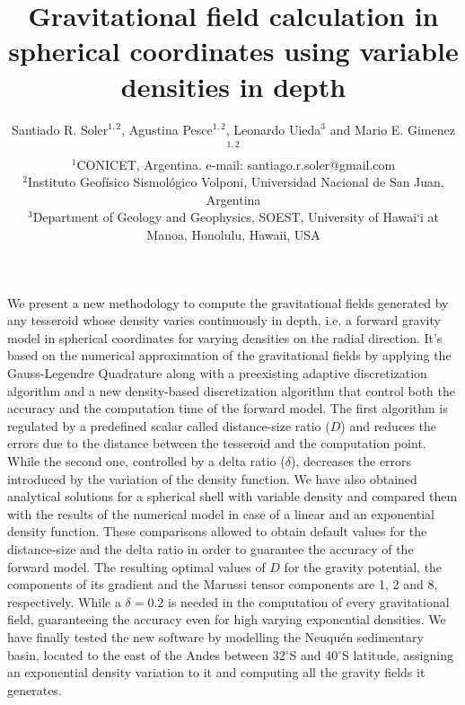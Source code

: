\documentclass[extra]{gji}
\begin{document}
\title[Variable Density Tesseroids]{
    Gravitational field calculation in spherical coordinates using variable 
    densities in depth
}
\author[S.R. Soler, A. Pesce, L. Uieda and M.E. Gimenez]{
    Santiado R. Soler$^{1,2}$, Agustina Pesce$^{1,2}$, Leonardo Uieda$^3$ and
    Mario E. Gimenez$^{1,2}$ \\
    $^1$CONICET, Argentina. e-mail: santiago.r.soler@gmail.com\\
    $^2$Instituto Geofísico Sismológico Volponi, Universidad Nacional de
    San Juan, Argentina\\
    $^3$Department of Geology and Geophysics, SOEST, University of Hawai‘i at
    Manoa, Honolulu, Hawaii, USA
    }


\maketitle

\begin{summary}
We present a new methodology to compute the gravitational fields generated by 
any tesseroid whose density varies continuously in depth, i.e. a forward 
gravity model in spherical coordinates for varying densities on the radial 
direction.
It's based on the numerical approximation of the gravitational fields by 
applying the Gauss-Legendre Quadrature along with a preexisting adaptive 
discretization algorithm and a new density-based discretization algorithm that 
control both the accuracy and the computation time of the forward model.
The first algorithm is regulated by a predefined scalar called distance-size 
ratio ($D$) and reduces the errors due to the distance between the tesseroid 
and the computation point.
While the second one, controlled by a delta ratio ($\delta$), decreases the 
errors introduced by the variation of the density function.
We have also obtained analytical solutions for a spherical shell with variable 
density and compared them with the results of the numerical model in case of a 
linear and an exponential density function.
These comparisons allowed to obtain default values for the distance-size and 
the delta ratio in order to guarantee the accuracy of the forward model.
The resulting optimal values of $D$ for the gravity potential, the components 
of its gradient and the Marussi tensor components are 1, 2 and 8, 
respectively.
While a $\delta=0.2$ is needed in the computation of every gravitational 
field, guaranteeing the accuracy even for high varying exponential densities.
We have finally tested the new software by modelling the Neuqu\'en sedimentary 
basin, located to the east of the Andes between 32$^\circ$S and 40$^\circ$S 
latitude, assigning an exponential density variation to it and computing all 
the gravity fields it generates.
\end{summary}
\end{document}
